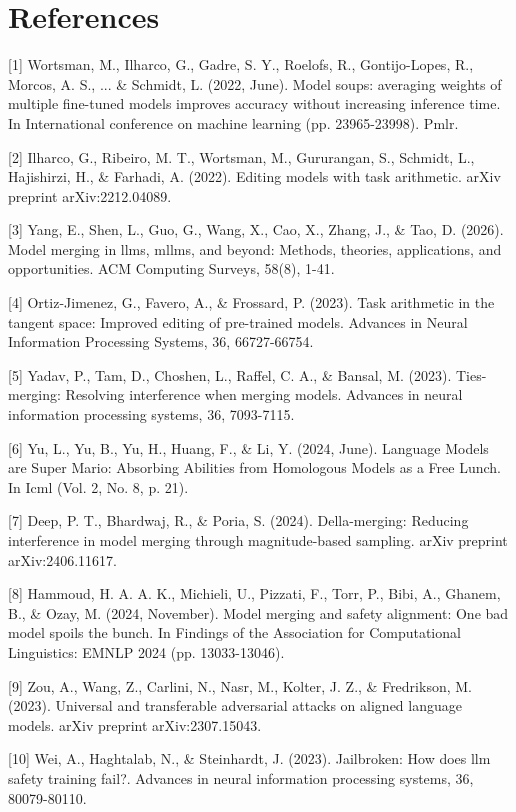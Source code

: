 \documentclass{article}
\begin{document}
\section*{References}
{
\small
[1] Wortsman, M., Ilharco, G., Gadre, S. Y., Roelofs, R., Gontijo-Lopes, R., Morcos, A. S., ... \& Schmidt, L. (2022, June). Model soups: averaging weights of multiple fine-tuned models improves accuracy without increasing inference time. In International conference on machine learning (pp. 23965-23998). Pmlr.

[2] Ilharco, G., Ribeiro, M. T., Wortsman, M., Gururangan, S., Schmidt, L., Hajishirzi, H., \& Farhadi, A. (2022). Editing models with task arithmetic. arXiv preprint arXiv:2212.04089.

[3] Yang, E., Shen, L., Guo, G., Wang, X., Cao, X., Zhang, J., \& Tao, D. (2026). Model merging in llms, mllms, and beyond: Methods, theories, applications, and opportunities. ACM Computing Surveys, 58(8), 1-41.

[4] Ortiz-Jimenez, G., Favero, A., \& Frossard, P. (2023). Task arithmetic in the tangent space: Improved editing of pre-trained models. Advances in Neural Information Processing Systems, 36, 66727-66754.

[5] Yadav, P., Tam, D., Choshen, L., Raffel, C. A., \& Bansal, M. (2023). Ties-merging: Resolving interference when merging models. Advances in neural information processing systems, 36, 7093-7115.

[6] Yu, L., Yu, B., Yu, H., Huang, F., \& Li, Y. (2024, June). Language Models are Super Mario: Absorbing Abilities from Homologous Models as a Free Lunch. In Icml (Vol. 2, No. 8, p. 21).

[7] Deep, P. T., Bhardwaj, R., \& Poria, S. (2024). Della-merging: Reducing interference in model merging through magnitude-based sampling. arXiv preprint arXiv:2406.11617.

[8] Hammoud, H. A. A. K., Michieli, U., Pizzati, F., Torr, P., Bibi, A., Ghanem, B., \& Ozay, M. (2024, November). Model merging and safety alignment: One bad model spoils the bunch. In Findings of the Association for Computational Linguistics: EMNLP 2024 (pp. 13033-13046).

[9] Zou, A., Wang, Z., Carlini, N., Nasr, M., Kolter, J. Z., \& Fredrikson, M. (2023). Universal and transferable adversarial attacks on aligned language models. arXiv preprint arXiv:2307.15043.

[10] Wei, A., Haghtalab, N., \& Steinhardt, J. (2023). Jailbroken: How does llm safety training fail?. Advances in neural information processing systems, 36, 80079-80110.

}
\end{document}
